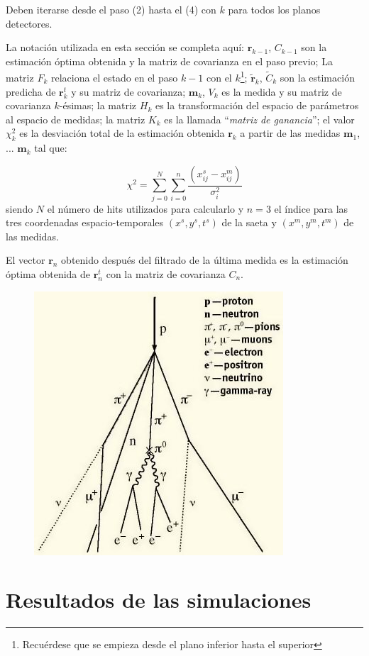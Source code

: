 \documentclass[a4paper]{article}
\let\vec\mathbf  %
\begin{document}
Deben iterarse desde el paso (2) hasta el (4) con $k$ para todos los planos detectores.

La notación utilizada en esta sección se completa aquí: $\vec{r}_{k - 1}$, $C_{k - 1}$ son la estimación óptima obtenida y la matriz de covarianza en el paso previo; La matriz $F_k$ relaciona el estado en el paso $k - 1$ con el $k$\footnote{Recuérdese que se empieza desde el plano inferior hasta el superior}; $\tilde{\vec{r}}_k$, $\tilde{C}_k$ son la estimación predicha de $\vec{r}^t_k$ y su matriz de covarianza; $\vec{m}_k$, $V_k$ es la medida y su matriz de covarianza $k$-ésimas; la matriz $H_k$ es la transformación del espacio de parámetros al espacio de medidas; la matriz $K_k$ es la llamada ``\textit{matriz de ganancia}''; el valor $\chi^2_k$ es la desviación total de la estimación obtenida $\vec{r}_k$ a partir de las medidas $\vec{m}_1$, ... $\vec{m}_k$ tal que:

\begin{equation}
    \chi^2 = \sum_{j = 0}^{N} \sum_{i = 0}^{n} \frac{\left(x^{s}_{ij} - x^{m}_{ij} \right)}{\sigma_{i}^2}
\end{equation}
siendo $N$ el número de hits utilizados para calcularlo y $n = 3$ el índice para las tres coordenadas espacio-temporales $(x^s, y^s, t^s)$ de la saeta y $(x^m, y^m, t^m)$ de las medidas.

El vector $\vec{r}_n$ obtenido después del filtrado de la última medida es la estimación óptima obtenida de $\vec{r}^t_n$ con la matriz de covarianza $C_n$.

\begin{figure}[h] 
    \centering
    \includegraphics[width=0.5\linewidth]{showers.jpg} 
    \caption{} 
    \label{fg:shower} 
\end{figure}

\section{Resultados de las simulaciones}
\end{document}
